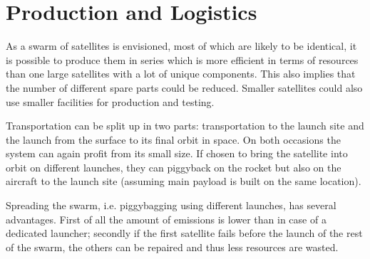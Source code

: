 \section{Production and Logistics}
\label{blSSPRO}

As a swarm of satellites is envisioned, most of which are likely to be identical, it is possible to produce them in series which is more efficient in terms of resources than one large satellites with a lot of unique components. This also implies that the number of different spare parts could be reduced. Smaller satellites could also use smaller facilities for production and testing. 

Transportation can be split up in two parts: transportation to the launch site and the launch from the surface to its final orbit in space. On both occasions the system can again profit from its small size. If chosen to bring the satellite into orbit on different launches, they can piggyback on the rocket but also on the aircraft to the launch site (assuming main payload is built on the same location).

Spreading the swarm, i.e. piggybagging using different launches, has several advantages. First of all the amount of emissions is lower than in case of a dedicated launcher; secondly if the first satellite fails before the launch of the rest of the swarm, the others can be repaired and thus less resources are wasted.